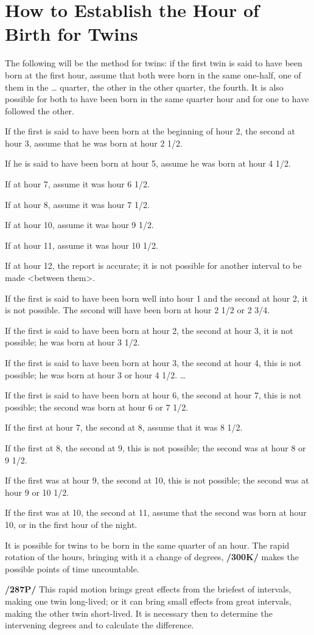 \section{How to Establish the Hour of Birth for Twins}

The following will be the method for twins: if the first twin is said to have been born at the first hour, assume that both were born in the same one-half, one of them in the … quarter, the other in the other
quarter, the fourth. It is also possible for both to have been born in the same quarter hour and for one to have followed the other.

If the first is said to have been born at the beginning of hour 2, the second at hour 3, assume that he was born at hour 2 1/2.

If he is said to have been born at hour 5, assume he was born at hour 4 1/2.

If at hour 7, assume it was hour 6 1/2.

If at hour 8, assume it was hour 7 1/2.

If at hour 10, assume it was hour 9 1/2.

If at hour 11, assume it was hour 10 1/2.

If at hour 12, the report is accurate; it is not possible for another interval to be made <between them>.

If the first is said to have been born well into hour 1 and the second at hour 2, it is not possible. The second will have been born at hour 2 1/2 or 2 3/4.

If the first is said to have been born at hour 2, the second at hour 3, it is not possible; he was born at hour 3 1/2.

If the first is said to have been born at hour 3, the second at hour 4, this is not possible; he was born at hour 3 or hour 4 1/2.
…

If the first is said to have been born at hour 6, the second at hour 7, this is not possible; the second was born at hour 6 or 7 1/2.

If the first at hour 7, the second at 8, assume that it was 8 1/2.

If the first at 8, the second at 9, this is not possible; the second was at hour 8 or 9 1/2.

If the first was at hour 9, the second at 10, this is not possible; the second was at hour 9 or 10 1/2.

If the first was at 10, the second at 11, assume that the second was born at hour 10, or in the first hour of the night.

It is possible for twins to be born in the same quarter of an hour. The rapid rotation of the hours, bringing with it a change of degrees, \textbf{/300K/} makes the possible points of time uncountable.

\textbf{/287P/} This rapid motion brings great effects from the briefest of intervals, making one twin long-lived; or it can bring small effects from great intervals, making the other twin short-lived. It is necessary then to determine the intervening degrees and to calculate the difference.

\newpage